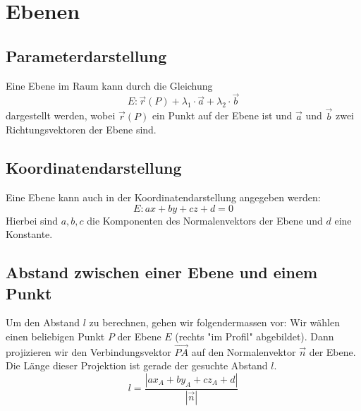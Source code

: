 \documentclass{article}
\begin{document}
\section*{Ebenen}
\begin{minipage}[t]{0.45\textwidth}
    \subsection*{Parameterdarstellung}
    Eine Ebene im Raum kann durch die Gleichung
    \begin{equation*}
        E: \vec{r}(P) + \lambda_1 \cdot \vec{a} + \lambda_2 \cdot \vec{b}
    \end{equation*}
    dargestellt werden, wobei \( \vec{r}(P) \) ein Punkt auf der Ebene ist und \( \vec{a} \) und \( \vec{b} \) zwei Richtungsvektoren der Ebene sind.
    \subsection*{Koordinatendarstellung}
    Eine Ebene kann auch in der Koordinatendarstellung angegeben werden:
    \begin{equation*}
        E: ax + by + cz + d = 0
    \end{equation*}
    Hierbei sind \( a, b, c \) die Komponenten des Normalenvektors der Ebene und \( d \) eine Konstante.

    \subsection*{Abstand zwischen einer Ebene und einem Punkt}
    Um den Abstand $l$ zu berechnen, gehen wir folgendermassen vor:
    Wir wählen einen beliebigen Punkt $P$ der Ebene $E$ (rechts "im
    Profil" abgebildet). Dann projizieren wir den Verbindungsvektor
    $\overrightarrow{PA}$ auf den Normalenvektor $\vec{n}$ der Ebene. Die Länge dieser
    Projektion ist gerade der gesuchte Abstand $l$.
    \begin{equation*}
        l = \frac{|ax_A + by_A + cz_A + d|}{|\vec{n}|}
    \end{equation*}
\end{minipage}
\hfill
\end{document}
